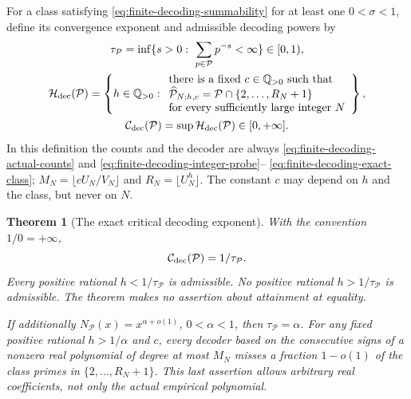 \documentclass[11pt]{article}
\newtheorem{theorem}{Theorem}[section]
\theoremstyle{definition}
\begin{document}
For a class satisfying
\eqref{eq:finite-decoding-summability} for at least one
$0<\sigma<1$, define its convergence exponent and admissible
decoding powers by
\begin{equation}
 \begin{gathered}
 \tau_{\mathcal P}=
    \inf\{s>0:\ \sum_{p\in\mathcal P}p^{-s}<\infty\}
                         \in[0,1),\\
 \mathcal H_{\rm dec}(\mathcal P)=
 \left\{h\in\mathbb Q_{>0}:
   \begin{array}{l}
   \text{there is a fixed $c\in\mathbb Q_{>0}$ such that}\\
   \widehat{\mathcal P}_{N;h,c}
      =\mathcal P\cap\{2,\ldots,R_N+1\}\\
   \text{for every sufficiently large integer $N$}
   \end{array}\right\},\\
 \mathcal C_{\rm dec}(\mathcal P)
       =\sup\mathcal H_{\rm dec}(\mathcal P)\in[0,+\infty].
 \end{gathered}
 \label{eq:prime-decoding-capacity-definition}
\end{equation}
In this definition the counts and the decoder are always
\eqref{eq:finite-decoding-actual-counts} and
\eqref{eq:finite-decoding-integer-probe}--%
\eqref{eq:finite-decoding-exact-class};
$M_N=\lfloor cU_N/V_N\rfloor$ and $R_N=\lfloor U_N^h\rfloor$.
The constant $c$ may depend on $h$ and the class, but never on $N$.

\begin{theorem}[The exact critical decoding exponent]
\label{thm:prime-decoding-critical-exponent}
With the convention $1/0=+\infty$,
\begin{equation}
             \mathcal C_{\rm dec}(\mathcal P)=1/\tau_{\mathcal P}.
 \label{eq:prime-decoding-critical-exponent}
\end{equation}
Every positive rational $h<1/\tau_{\mathcal P}$ is admissible.
No positive rational $h>1/\tau_{\mathcal P}$ is admissible.
The theorem makes no assertion about attainment at equality.

If additionally
$N_{\mathcal P}(x)=x^{\alpha+o(1)}$, $0<\alpha<1$, then
$\tau_{\mathcal P}=\alpha$.
For any fixed positive rational $h>1/\alpha$ and $c$, every
decoder based on
the consecutive signs of a nonzero real polynomial of degree
at most $M_N$ misses a fraction $1-o(1)$ of the class primes
in $\{2,\ldots,R_N+1\}$.
This last assertion allows arbitrary real coefficients, not
only the actual empirical polynomial.
\end{theorem}
\end{document}

